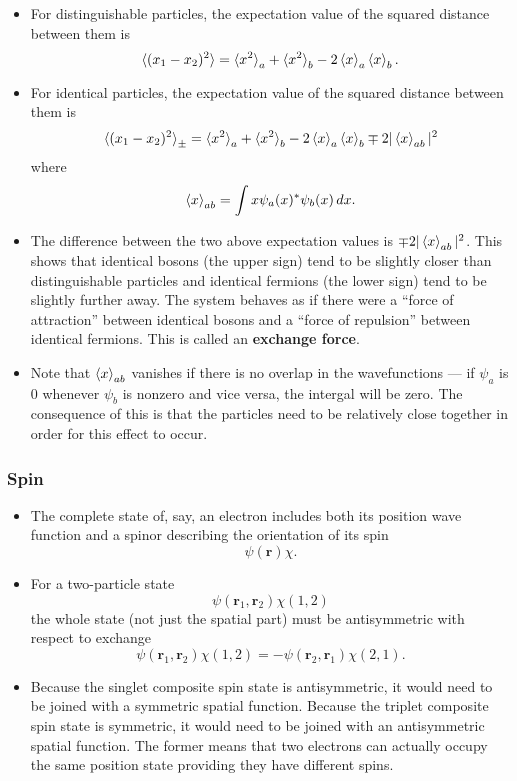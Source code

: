 \documentclass{article}
\renewcommand{\vec}[1]{\boldsymbol{\mathbf{#1}}}
\begin{document}
\begin{itemize}
  \item For distinguishable particles, the expectation value of the squared distance between them is \[\braket{(x_1 - x_2)^2} = \braket{x^2}_a + \braket{x^2}_b - 2 \braket{x}_a \braket{x}_b.\]

  \item For identical particles, the expectation value of the squared distance between them is \[\braket{(x_1 - x_2)^2}_\pm = \braket{x^2}_a + \braket{x^2}_b - 2 \braket{x}_a \braket{x}_b \mp 2 |\braket{x}_{a b}|^2\] where \[\braket{x}_{a b} = \int x \psi_a(x)^* \psi_b(x) \,d x.\]

  \item The difference between the two above expectation values is $\mp 2 |\braket{x}_{a b}|^2$. This shows that identical bosons (the upper sign) tend to be slightly closer than distinguishable particles and identical fermions (the lower sign) tend to be slightly further away. The system behaves as if there were a ``force of attraction'' between identical bosons and a ``force of repulsion'' between identical fermions. This is called an \textbf{exchange force}.

  \item Note that $\braket{x}_{a b}$ vanishes if there is no overlap in the wavefunctions — if $\psi_a$ is $0$ whenever $\psi_b$ is nonzero and vice versa, the intergal will be zero. The consequence of this is that the particles need to be relatively close together in order for this effect to occur.
\end{itemize}

\subsubsection{Spin}

\begin{itemize}
  \item The complete state of, say, an electron includes both its position wave function and a spinor describing the orientation of its spin \[\psi(\vec{r}) \chi.\]

  \item For a two-particle state \[\psi(\vec{r}_1, \vec{r}_2) \chi(1, 2)\] the whole state (not just the spatial part) must be antisymmetric with respect to exchange \[\psi(\vec{r}_1, \vec{r}_2) \chi(1, 2) = -\psi(\vec{r}_2, \vec{r}_1) \chi(2, 1).\]

  \item Because the singlet composite spin state is antisymmetric, it would need to be joined with a symmetric spatial function. Because the triplet composite spin state is symmetric, it would need to be joined with an antisymmetric spatial function. The former means that two electrons can actually occupy the same position state providing they have different spins.
\end{itemize}
\end{document}
